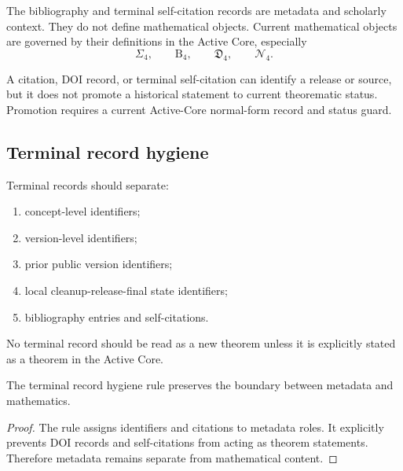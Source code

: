 \begin{definition}
\label{def:v408-bibliography-role-principle}
The bibliography and terminal self-citation records are metadata and scholarly
context. They do not define mathematical objects. Current mathematical
objects are governed by their definitions in the Active Core, especially
\[
 \Sigma_4,\qquad
 \mathrm B_4,\qquad
 \mathfrak D_4,\qquad
 \mathcal N_4.
\]
\end{definition}

\begin{remark}
\label{rem:v408-citation-does-not-promote-theorematic-status}
A citation, DOI record, or terminal self-citation can identify a release or
source, but it does not promote a historical statement to current theorematic
status. Promotion requires a current Active-Core normal-form record and status
guard.
\end{remark}

\subsection{Terminal record hygiene}
\label{subsec:v408-terminal-record-hygiene}

\begin{definition}
\label{def:v408-terminal-record-hygiene-rule}
Terminal records should separate:
\begin{enumerate}[leftmargin=*]
 \item concept-level identifiers;
 \item version-level identifiers;
 \item prior public version identifiers;
 \item local cleanup-release-final state identifiers;
 \item bibliography entries and self-citations.
\end{enumerate}
No terminal record should be read as a new theorem unless it is explicitly
stated as a theorem in the Active Core.
\end{definition}

\begin{lemma}
\label{lem:v408-terminal-records-preserve-metadata-boundaries}
The terminal record hygiene rule preserves the boundary between metadata and
mathematics.
\end{lemma}

\begin{proof}
The rule assigns identifiers and citations to metadata roles. It explicitly
prevents DOI records and self-citations from acting as theorem statements.
Therefore metadata remains separate from mathematical content.
\end{proof}

